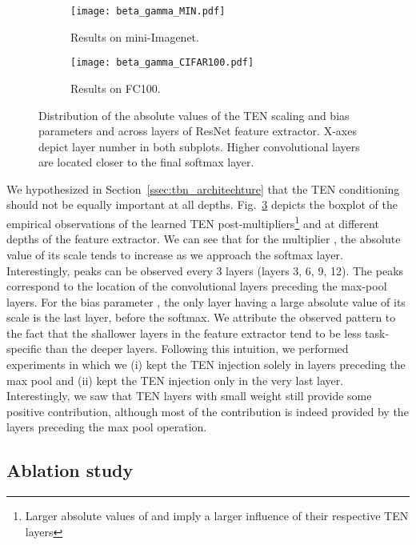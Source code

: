 \documentclass{article}
\begin{document}
\begin{figure}[t]
    \centering
    \begin{subfigure}[t]{0.49\textwidth}
        \texttt{[image: beta\_gamma\_MIN.pdf]}
        \caption{Results on mini-Imagenet.}
        \label{fig:tbn_scaling_miniimagenet}
    \end{subfigure}
    \begin{subfigure}[t]{0.49\textwidth}
        \texttt{[image: beta\_gamma\_CIFAR100.pdf]}
        \caption{Results on FC100.}
        \label{fig:tbn_scaling_cifar100}
    \end{subfigure}
    \caption{Distribution of the absolute values of the TEN scaling and bias parameters  and  across layers of ResNet feature extractor. X-axes depict layer number in both subplots. Higher convolutional layers are located closer to the final softmax layer.}
    \label{fig:tbn_scaling}
\end{figure}

We hypothesized in Section~\ref{ssec:tbn_architechture} that the TEN conditioning should not be equally important at all depths. Fig.~\ref{fig:tbn_scaling} depicts the boxplot of the empirical observations of the learned TEN post-multipliers\footnote{Larger absolute values of  and  imply a larger influence of their respective TEN layers}  and  at different depths of the feature extractor. We can see that for the multiplier , the absolute value of its scale  tends to increase as we approach the softmax layer. Interestingly, peaks can be observed every 3 layers (layers 3, 6, 9, 12). The peaks correspond to the location of the convolutional layers preceding the max-pool layers. For the bias parameter , the only layer having a large absolute value of its scale is the last layer, before the softmax. We attribute the observed pattern to the fact that the shallower layers in the feature extractor tend to be less task-specific than the deeper layers. Following this intuition, we performed experiments in which we (i) kept the TEN injection solely in layers preceding the max pool and (ii) kept the TEN injection only in the very last layer. Interestingly, we saw that TEN layers with small weight still provide some positive contribution, although most of the contribution is indeed provided by the layers preceding the max pool operation.


\subsection{Ablation study} \label{ssec:multitask_ablation}
\end{document}
